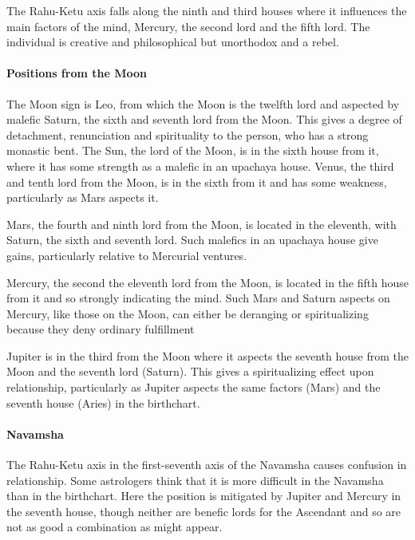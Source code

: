  

The Rahu-Ketu axis falls along the ninth and third houses where it influences the main factors of the mind, Mercury, the second lord and the fifth lord. The individual is creative and philosophical but unorthodox and a rebel.

 

\paragraph{Positions from the Moon}

 

The Moon sign is Leo, from which the Moon is the twelfth lord and aspected by malefic Saturn, the sixth and seventh lord from the Moon. This gives a degree of detachment, renunciation and spirituality to the person, who has a strong monastic bent. The Sun, the lord of the Moon, is in the sixth house from it, where it has some strength as a malefic in an upachaya house. Venus, the third and tenth lord from the Moon, is in the sixth from it and has some weakness, particularly as Mars aspects it.

 

Mars, the fourth and ninth lord from the Moon, is located in the eleventh, with Saturn, the sixth and seventh lord. Such malefics in an upachaya house give gains, particularly relative to Mercurial ventures.

 

Mercury, the second the eleventh lord from the Moon, is located in the fifth house from it and so strongly indicating the mind. Such Mars and Saturn aspects on Mercury, like those on the Moon, can either be deranging or spiritualizing because they deny ordinary fulfillment

 

Jupiter is in the third from the Moon where it aspects the seventh house from the Moon and the seventh lord (Saturn). This gives a spiritualizing effect upon relationship, particularly as Jupiter aspects the same factors (Mars) and the seventh house (Aries) in the birthchart.

 

\paragraph{Navamsha}

 

The Rahu-Ketu axis in the first-seventh axis of the Navamsha causes confusion in relationship. Some astrologers think that it is more difficult in the Navamsha than in the birthchart. Here the position is mitigated by Jupiter and Mercury in the seventh house, though neither are benefic lords for the Ascendant and so are not as good a combination as might appear.

